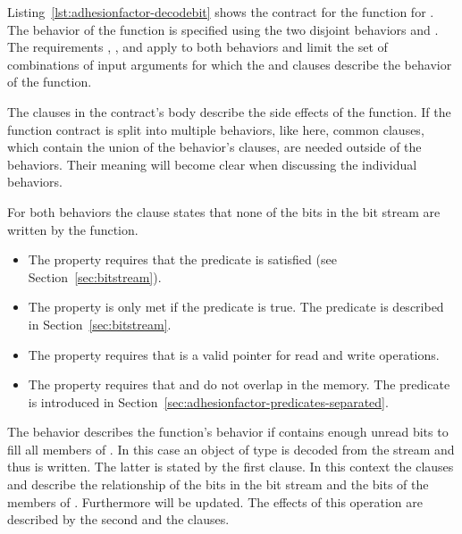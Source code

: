 Listing~\ref{lst:adhesionfactor-decodebit} shows the contract
for the  function for .
The behavior of the function is specified using the
two disjoint behaviors  and .
The requirements , ,
 and  apply to both behaviors
and limit the set of combinations of input arguments for which the
 and  clauses describe the behavior
of the function.

The  clauses in the contract's body describe the
side effects of the function.
If the function contract is split into multiple behaviors,
like here, common  clauses, which contain the union
of the behavior's  clauses, are needed outside
of the behaviors.
Their meaning will become clear when discussing the
individual  behaviors.

For both behaviors the  clause states that
none of the bits in the bit stream are written by the function.

\begin{itemize}
\item
The property  requires that the predicate 
is satisfied (see Section~\ref{sec:bitstream}).

\item
The property  is only met if the  predicate is true.
The predicate  is described in
Section~\ref{sec:bitstream}.

\item
The property  requires that  is a valid pointer for read and write operations.

\item
The property  requires that  and  do not overlap in the memory.
The 
predicate is introduced in
Section~\ref{sec:adhesionfactor-predicates-separated}.
\end{itemize}



The behavior  describes the function's behavior if
 contains enough unread bits to fill
all members of . 
In this case an object of type 
is decoded from the stream
and thus  is written.
The latter is stated by the first  clause.
In this context the  clauses  and 
describe the relationship of the bits in the bit stream and
the bits of the members of .
Furthermore  will be updated.
The effects of this operation are described by the second
 and the  clauses.


